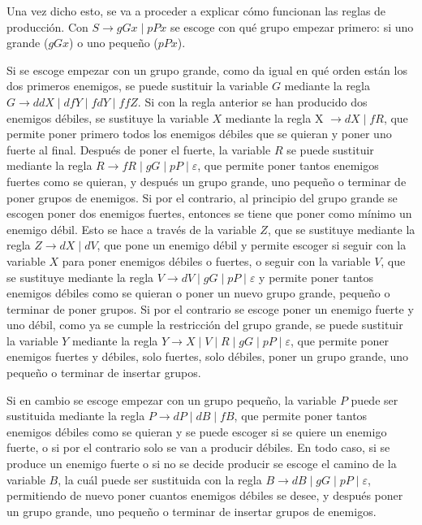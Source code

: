 \documentclass[11pt,a4paper]{article}
\begin{document}
		Una vez dicho esto, se va a proceder a explicar cómo funcionan las reglas de producción. Con $S \rightarrow gGx
		\; | \; pPx$ se escoge con qué grupo empezar primero: si uno grande ($gGx$) o uno pequeño ($pPx$). \par
		
		Si se escoge empezar con un grupo grande, como da igual en qué orden están los dos primeros enemigos, se puede
		sustituir la variable $G$ mediante la regla $G \rightarrow ddX \; | \; dfY \; | \; fdY \; | \; ffZ$. Si con la
		regla anterior se han producido dos enemigos débiles, se sustituye la variable $X$ mediante la regla X 
		$\rightarrow dX \; | \; fR$, que permite poner primero todos los enemigos débiles que se quieran y poner uno
		fuerte al final. Después de poner el fuerte, la variable $R$ se puede sustituir mediante la regla $R \rightarrow
		fR \; | \; gG \; | \; pP \; | \; \varepsilon$, que permite poner tantos enemigos fuertes como se quieran, y
		después un grupo grande, uno pequeño o terminar de poner grupos de enemigos. Si por el contrario, al principio
		del grupo grande se escogen poner dos enemigos fuertes, entonces se tiene que poner como mínimo un enemigo
		débil. Esto se hace a través de la variable $Z$, que se sustituye mediante la regla $Z \rightarrow dX \; | \;
		dV$, que pone un enemigo débil y permite escoger si seguir con la variable $X$ para poner enemigos débiles o
		fuertes, o seguir con la variable $V$, que se sustituye mediante la regla $V \rightarrow dV \; | \; gG \; | \;
		pP \; | \; \varepsilon$ y permite poner tantos enemigos débiles como se quieran o poner un nuevo grupo grande,
		pequeño o terminar de poner grupos. Si por el contrario se escoge poner un enemigo fuerte y uno débil, como ya
		se cumple la restricción del grupo grande, se puede sustituir la variable $Y$ mediante la regla $Y \rightarrow X
		\; | \; V \; | \; R \; | \; gG \; | \; pP \; | \; \varepsilon$, que permite poner enemigos fuertes y débiles,
		solo fuertes, solo débiles, poner un grupo grande, uno pequeño o terminar de insertar grupos.
		
		Si en cambio se escoge empezar con un grupo pequeño, la variable $P$ puede ser sustituida mediante la regla
		$P \rightarrow dP \; | \; dB \; | \; fB$, que permite poner tantos enemigos débiles como se quieran y se puede
		escoger si se quiere un enemigo fuerte, o si por el contrario solo se van a producir débiles. En todo caso, si
		se produce un enemigo fuerte o si no se decide producir se escoge el camino de la variable $B$, la cuál puede
		ser sustituida con la regla $B \rightarrow dB \; | \; gG \; | \; pP \; | \; \varepsilon$, permitiendo de nuevo
		poner cuantos enemigos débiles se desee, y después poner un grupo grande, uno pequeño o terminar de insertar
		grupos de enemigos. \par
		
\end{document}
